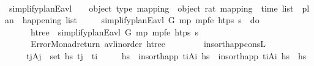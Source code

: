 \begin{isabellebody}
\ \ \ \ {\isacharbraceright}{\kern0pt}{\isachardoublequoteclose}\isanewline
\isanewline
\ \ \isamarkupfalse%
\ simplify{\isacharunderscore}{\kern0pt}planE{\isacharunderscore}{\kern0pt}avl\ {\isacharcolon}{\kern0pt}{\isacharcolon}{\kern0pt}\ {\isachardoublequoteopen}{\isacharunderscore}{\kern0pt}\ {\isasymRightarrow}\ {\isacharparenleft}{\kern0pt}object{\isacharcomma}{\kern0pt}\ type{\isacharparenright}{\kern0pt}\ mapping\ {\isasymRightarrow}\ {\isacharparenleft}{\kern0pt}object{\isacharcomma}{\kern0pt}\ rat{\isacharparenright}{\kern0pt}\ mapping\ {\isasymRightarrow}\ time\ list\ {\isasymRightarrow}\ plan\ {\isasymRightarrow}\ {\isacharunderscore}{\kern0pt}{\isacharplus}{\kern0pt}happening\ list{\isachardoublequoteclose}\ \isanewline
\ \ \ \ {\isachardoublequoteopen}simplify{\isacharunderscore}{\kern0pt}planE{\isacharunderscore}{\kern0pt}avl\ G\ mp\ mp{\isacharunderscore}{\kern0pt}fe\ htps\ {\isasympi}s\ {\isacharequal}{\kern0pt}\ do\ {\isacharbraceleft}{\kern0pt}\ \isanewline
\ \ \ \ \ \ htree\ {\isasymleftarrow}\ simplify{\isacharunderscore}{\kern0pt}planE{\isacharunderscore}{\kern0pt}avl{\isacharprime}{\kern0pt}\ G\ mp\ mp{\isacharunderscore}{\kern0pt}fe\ htps\ {\isasympi}s{\isacharsemicolon}{\kern0pt}\isanewline
\ \ \ \ \ \ Error{\isacharunderscore}{\kern0pt}Monad{\isachardot}{\kern0pt}return\ {\isacharparenleft}{\kern0pt}avl{\isacharunderscore}{\kern0pt}inorder\ htree{\isacharparenright}{\kern0pt}\isanewline
\ \ \ \ {\isacharbraceright}{\kern0pt}{\isachardoublequoteclose}\isanewline
\isanewline
\ \ \isamarkupfalse%
\ insort{\isacharunderscore}{\kern0pt}happ{\isacharunderscore}{\kern0pt}consL{\isacharcolon}{\kern0pt}\isanewline
\ \ \ \ \ {\isachardoublequoteopen}{\isasymforall}{\isacharparenleft}{\kern0pt}t\isactrlsub j{\isacharcomma}{\kern0pt}A\isactrlsub j{\isacharparenright}{\kern0pt}\ {\isasymin}\ set\ hs\ t\isactrlsub j\ {\isacharless}{\kern0pt}\ t\isactrlsub i{\isachardoublequoteclose}\isanewline
\ \ \ \ \ {\isachardoublequoteopen}hs\ {\isacharat}{\kern0pt}\ {\isacharparenleft}{\kern0pt}insort{\isacharunderscore}{\kern0pt}happ\ {\isacharparenleft}{\kern0pt}t\isactrlsub i{\isacharcomma}{\kern0pt}A\isactrlsub i{\isacharparenright}{\kern0pt}\ hs\ {\isacharequal}{\kern0pt}\ insort{\isacharunderscore}{\kern0pt}happ\ {\isacharparenleft}{\kern0pt}t\isactrlsub i{\isacharcomma}{\kern0pt}A\isactrlsub i{\isacharparenright}{\kern0pt}\ {\isacharparenleft}{\kern0pt}hs\ {\isacharat}{\kern0pt}\ hs\isanewline

\end{isabellebody}
